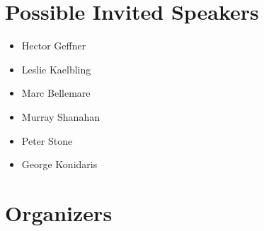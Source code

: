 \documentclass[10pt]{article}
\begin{document}
\section*{Possible Invited Speakers}

\begin{itemize}
  \item Hector Geffner
  \item Leslie Kaelbling
  \item Marc Bellemare
  \item Murray Shanahan
  \item Peter Stone 
  \item George Konidaris
\end{itemize}


\section*{Organizers}
\end{document}
